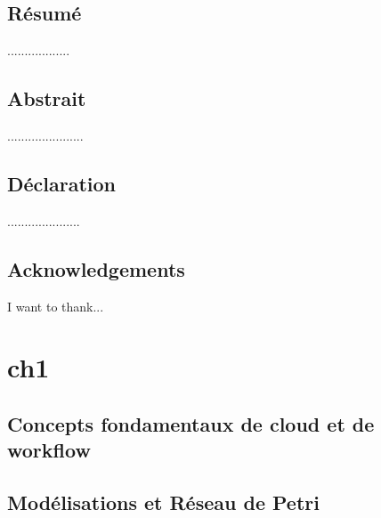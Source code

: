 \documentclass[12pt,twoside]{report}
\author{Zerrouki Djamel}
\theoremstyle{plain}
\theoremstyle{definition}
\theoremstyle{remark}
\begin{document}
 
\chapter*{Résumé}
..................

\chapter*{Abstrait}
......................

\chapter*{Déclaration}
.....................

\chapter*{Acknowledgements}
I want to thank...
\listoffigures

\listoftables

\tableofcontents

\part{ch1}
\chapter{Concepts fondamentaux de cloud et de workflow }



\chapter{Modélisations et Réseau de Petri}


%
 
 
 

 \printbibliography
\end{document}

